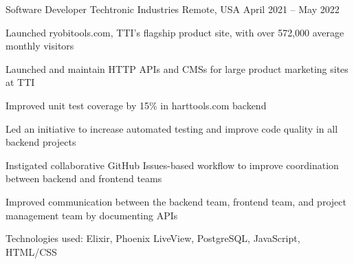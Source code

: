 \begin{cventries}
    \cventry
    {Software Developer} %
    {Techtronic Industries} %
    {Remote, USA} %
    {April 2021 -- May 2022} %
    {
      \begin{cvitems}
      \item Launched ryobitools.com, TTI’s flagship product site, with over
        572,000 average monthly visitors
      \item Launched and maintain HTTP APIs and CMSs for large product marketing
        sites at TTI
      \item Improved unit test coverage by 15\% in harttools.com backend
      \item Led an initiative to increase automated testing and improve code
        quality in all backend projects
      \item Instigated collaborative GitHub Issues-based workflow to improve
        coordination between backend and frontend teams
      \item Improved communication between the backend team, frontend team, and
        project management team by documenting APIs
      \item Technologies used: Elixir, Phoenix LiveView, PostgreSQL, JavaScript,
        HTML/CSS
      \end{cvitems}
    }

  \end{cventries}
